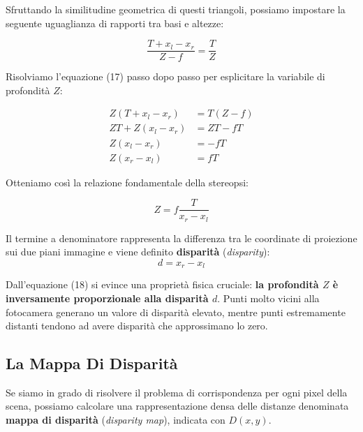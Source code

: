 ﻿\documentclass[11pt, a4paper]{article}
\begin{document}
Sfruttando la similitudine geometrica di questi triangoli, possiamo impostare la seguente uguaglianza di rapporti tra basi e altezze:

\begin{equation}
\frac{T + x_l - x_r}{Z - f} = \frac{T}{Z}
\end{equation}

Risolviamo l'equazione (17) passo dopo passo per esplicitare la variabile di profondità $Z$:

\begin{align*}
Z(T + x_l - x_r) &= T(Z - f) \\
Z T + Z(x_l - x_r) &= Z T - f T \\
Z(x_l - x_r) &= - f T \\
Z(x_r - x_l) &= f T
\end{align*}

Otteniamo così la relazione fondamentale della stereopsi:

\begin{equation}
\boxed{Z = f \frac{T}{x_r - x_l}}
\end{equation}

Il termine a denominatore rappresenta la differenza tra le coordinate di proiezione sui due piani immagine e viene definito \textbf{disparità} (\emph{disparity}):
\begin{equation}
d = x_r - x_l
\end{equation}

Dall'equazione (18) si evince una proprietà fisica cruciale: \textbf{la profondità $Z$ è inversamente proporzionale alla disparità $d$}. Punti molto vicini alla fotocamera generano un valore di disparità elevato, mentre punti estremamente distanti tendono ad avere disparità che approssimano lo zero.



\subsection{La Mappa Di Disparità}

Se siamo in grado di risolvere il problema di corrispondenza per ogni pixel della scena, possiamo calcolare una rappresentazione densa delle distanze denominata \textbf{mappa di disparità} (\emph{disparity map}), indicata con $D(x,y)$.

\end{document}
